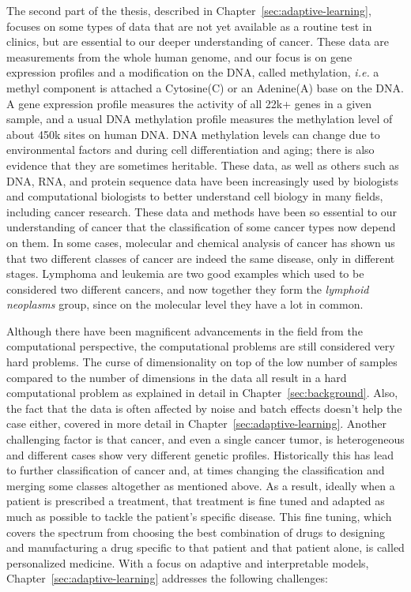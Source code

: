 The second part of the thesis, described in
Chapter~\ref{sec:adaptive-learning}, focuses on some types of data that are not
yet available as a routine test in clinics, but are essential to our deeper
understanding of cancer. These data are measurements from the whole human
genome, and our focus is on gene expression profiles and a modification on the
DNA, called methylation, \emph{i.e.} a methyl component is attached a
Cytosine(C) or an Adenine(A) base on the DNA. A gene expression profile
measures the activity of all 22k+ genes in a given sample, and a usual DNA
methylation profile measures the methylation level of about 450k sites on human
DNA. DNA methylation levels can change due to environmental factors and during
cell differentiation and aging; there is also evidence that they are sometimes
heritable. These data, as well as others such as DNA, RNA, and protein sequence
data have been increasingly used by biologists and computational biologists to
better understand cell biology in many fields, including cancer research. These
data and methods have been so essential to our understanding of cancer that the
classification of some cancer types now depend on them. In some cases,
molecular and chemical analysis of cancer has shown us that two different
classes of cancer are indeed the same disease, only in different stages.
Lymphoma and leukemia are two good examples which used to be considered two
different cancers, and now together they form the \emph{lymphoid neoplasms}
group, since on the molecular level they have a lot in common.

Although there have been magnificent advancements in the field from the
computational perspective, the computational problems are still considered very
hard problems. The curse of dimensionality on top of the low number of samples
compared to the number of dimensions in the data all result in a hard
computational problem as explained in detail in Chapter~\ref{sec:background}.
Also, the fact that the data is often affected by noise and batch effects
doesn't help the case either, covered in more detail in
Chapter~\ref{sec:adaptive-learning}. Another challenging factor is that cancer,
and even a single cancer tumor, is heterogeneous and different cases show very
different genetic profiles. Historically this has lead to further
classification of cancer and, at times changing the classification and merging
some classes altogether as mentioned above. As a result, ideally when a
patient is prescribed a treatment, that treatment is fine tuned and adapted as
much as possible to tackle the patient's specific disease. This fine tuning,
which covers the spectrum from choosing the best combination of drugs to
designing and manufacturing a drug specific to that patient and that patient
alone, is called personalized medicine. With a focus on adaptive and
interpretable models, Chapter~\ref{sec:adaptive-learning} addresses the
following challenges:

